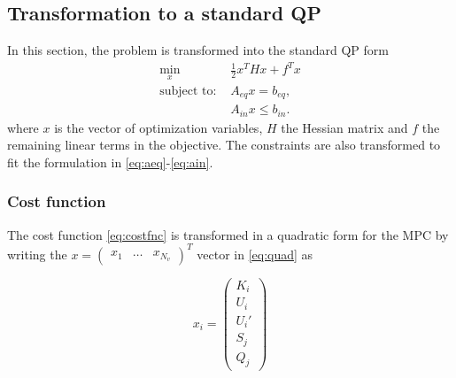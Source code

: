 \documentclass[letterpaper,10pt,conference]{ieeeconf}
\begin{document}
\subsection{Transformation to a standard QP}
In this section, the problem is transformed into the standard QP form
\begin{subequations} \label{stform}
\begin{align}\label{eq:quad}
\min_{x}\; &\frac{1}{2}x^THx+f^Tx\\
\text{subject to: }
&A_{eq}x =b_{eq},\label{eq:aeq}\\
&A_{in}x \leq b_{in}.\label{eq:ain}
\end{align}
\end{subequations}
where $x$ is the vector of optimization variables, $H$ the Hessian matrix and $f$ the remaining linear terms in the objective. The constraints are also transformed to fit the formulation in \eqref{eq:aeq}-\eqref{eq:ain}.
\subsubsection{Cost function}
The cost function \eqref{eq:costfnc} is transformed in a quadratic form for the MPC by writing the $x=\begin{pmatrix}x_1&\dots&x_{N_v}  \end{pmatrix}^T$ vector in \eqref{eq:quad} as


\begin{equation}
x_i=\begin{pmatrix}
K_i \\ U_i\\ U_i' \\ S_j \\ Q_j
\end{pmatrix}
\end{equation}
\end{document}
